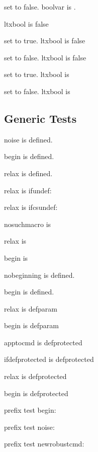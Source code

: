 \documentclass{article}
\begin{document}
set to false. boolvar is .

\newtoggle{ltxbool}
ltxbool is \iftoggle{ltxbool}{true}{false}

set to true. ltxbool is \iftoggle{ltxbool}{true}{false}

set to false. ltxbool is \iftoggle{ltxbool}{true}{false}

\toggletrue{ltxbool}
set to true. ltxbool is 

\togglefalse{ltxbool}
set to false. ltxbool is 

\subsection{Generic Tests}

noise is  defined.

begin is  defined.

relax is  defined.

relax is ifundef: 

relax is ifcsundef: 

nosuchmacro is 

relax is 

begin is 

nobeginning is  defined.

begin is  defined.

relax is  defparam

begin is  defparam

apptocmd is  defprotected

ifdefprotected is  defprotected

relax is  defprotected

begin is  defprotected

prefix test begin: 

prefix test noise: 

prefix test newrobustcmd: 
\end{document}
